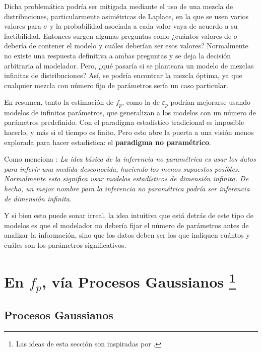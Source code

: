 Dicha problem\'atica podr\'ia ser mitigada mediante el uso de una mezcla de distribuciones, particularmente asim\'etricas de Laplace, en la que se usen varios valores para $\sigma$ y la probabilidad asociada a cada valor vaya de acuerdo a su factibilidad. Entonces surgen algunas preguntas como ¿cu\'antos valores de $\sigma$ deber\'ia de contener el modelo y cu\'ales deber\'ian ser esos valores? Normalmente no existe una respuesta definitiva a ambas preguntas y se deja la decisi\'on arbitraria al modelador. Pero, ¿qu\'e pasar\'ia si se planteara un modelo de mezclas infinitas de distribuciones? As\'i, se podr\'ia encontrar la mezcla \'optima, ya que cualquier mezcla con n\'umero fijo de par\'ametros ser\'ia un caso particular.

En resumen, tanto la estimaci\'on de $f_p$, como la de $\varepsilon_p$ podr\'ian mejorarse usando modelos de infinitos par\'ametros, que generalizan a los modelos con un n\'umero de par\'ametros predefinido. Con el paradigma estad\'istico tradicional es imposible hacerlo, y m\'as si el tiempo es finito. Pero esto abre la puerta a una visi\'on menos explorada para hacer estad\'istica: el \textbf{paradigma no param\'etrico}.

Como menciona \cite{Wasserman_Nonparametric}: \textit{La idea b\'asica de la inferencia no param\'etrica es usar los datos para inferir una medida desconocida, haciendo los menos supuestos posibles. Normalmente esto significa usar modelos estad\'isticos de dimensi\'on infinita. De hecho, un mejor nombre para la inferencia no param\'etrica podr\'ia ser inferencia de dimensi\'on infinita.}

Y si bien esto puede sonar irreal, la idea intuitiva que est\'a detr\'as de este tipo de modelos es que el modelador no deber\'ia fijar el n\'umero de par\'ametros antes de analizar la informaci\'on, sino que los datos deben ser los que indiquen cu\'antos y cu\'ales son los par\'ametros significativos.

\section[En $f_p$, v\'ia Procesos Gaussianos]{
    En $f_p$, v\'ia Procesos Gaussianos
    \footnote{Las ideas de esta secci\'on son inspiradas por \cite{Rasmussen_GauProc}.}
}

\subsection{Procesos Gaussianos}

